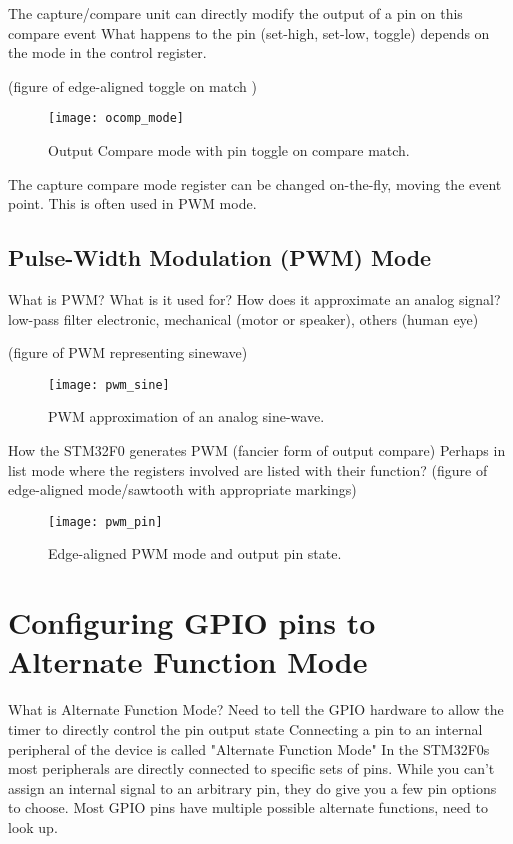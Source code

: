 \documentclass[11pt,fleqn]{book} %
\begin{document}
        The capture/compare unit can directly modify the output of a pin on this compare event
        What happens to the pin (set-high, set-low, toggle) depends on the mode in the control register. 
        
        (figure of edge-aligned toggle on match )
        \begin{figure}[]
            \centering\texttt{[image: ocomp\_mode]}
            \caption{Output Compare mode with pin toggle on compare match.}
            \label{ocomp_mode}
        \end{figure}
    
        The capture compare mode register can be changed on-the-fly, moving the event point. This is often used in PWM mode.
    
    \subsection{Pulse-Width Modulation (PWM) Mode}
    What is PWM?
    What is it used for? How does it approximate an analog signal?
        low-pass filter
        electronic, mechanical (motor or speaker), others (human eye)
        
    (figure of PWM representing sinewave)
    \begin{figure}[]
        \centering\texttt{[image: pwm\_sine]}
        \caption{PWM approximation of an analog sine-wave.}
        \label{pwm_sine}
    \end{figure}
    
    How the STM32F0 generates PWM (fancier form of output compare)
    Perhaps in list mode where the registers involved are listed with their function?
    (figure of edge-aligned mode/sawtooth with appropriate markings)
     \begin{figure}[]
        \centering\texttt{[image: pwm\_pin]}
        \caption{Edge-aligned PWM mode and output pin state.}
        \label{pwm_pin}
    \end{figure}

\section{Configuring GPIO pins to Alternate Function Mode}
    What is Alternate Function Mode?
    Need to tell the GPIO hardware to allow the timer to directly control the pin output state
    Connecting a pin to an internal peripheral of the device is called "Alternate Function Mode"
    In the STM32F0s most peripherals are directly connected to specific sets of pins. 
        While you can't assign an internal signal to an arbitrary pin, they do give you a few pin options to choose.
        Most GPIO pins have multiple possible alternate functions, need to look up. 
    
\end{document}
